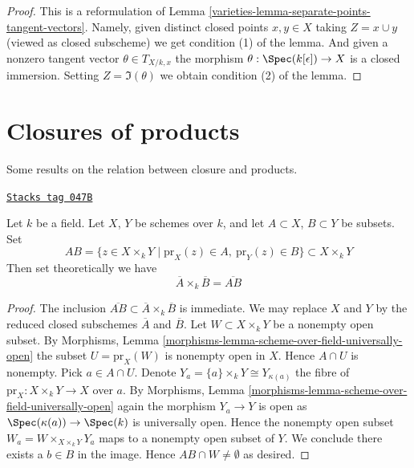 \begin{proof}

This is a reformulation of
Lemma \ref{varieties-lemma-separate-points-tangent-vectors}.
Namely, given distinct closed points
$x, y \in X$ taking $Z = x \cup y$ (viewed as closed
subscheme) we get condition (1) of the lemma.
And given a nonzero tangent vector $\theta \in T_{X/k, x}$
the morphism $\theta : \Spec(k[\epsilon]) \to X$
is a closed immersion. Setting $Z = \Im(\theta)$
we obtain condition (2) of the lemma.
\end{proof}

\section{Closures of products}
\label{varieties-section-closure-of-products}
Some results on the relation between closure and products.

\begin{lemma}
\label{varieties-lemma-closure-of-product}
\href{https://stacks.math.columbia.edu/tag/047B}{\texttt{Stacks tag 047B}}

Let $k$ be a field.
Let $X$, $Y$ be schemes over $k$, and let
$A \subset X$, $B \subset Y$ be subsets.
Set
$$
AB =
\{z \in X \times_k Y \mid \text{pr}_X(z) \in A, \ \text{pr}_Y(z) \in B\}
\subset X \times_k Y
$$
Then set theoretically we have
$$
\overline{A} \times_k \overline{B} = \overline{AB}
$$
\end{lemma}

\begin{proof}
The inclusion $\overline{AB} \subset \overline{A} \times_k \overline{B}$
is immediate.
We may replace $X$ and $Y$ by the reduced closed subschemes $\overline{A}$
and $\overline{B}$.
Let $W \subset X \times_k Y$ be a nonempty open subset. By
Morphisms, Lemma \ref{morphisms-lemma-scheme-over-field-universally-open}
the subset $U = \text{pr}_X(W)$ is nonempty open in $X$.
Hence $A \cap U$ is nonempty. Pick $a \in A \cap U$.
Denote $Y_a = \{a\} \times_k Y \cong Y_{\kappa(a)}$
the fibre of $\text{pr}_X : X \times_k Y \to X$ over $a$. By
Morphisms, Lemma \ref{morphisms-lemma-scheme-over-field-universally-open}
again the morphism $Y_a \to Y$ is open as
$\Spec(\kappa(a)) \to \Spec(k)$ is universally open.
Hence the nonempty open
subset $W_a = W \times_{X \times_k Y} Y_a$
maps to a nonempty open subset of $Y$.
We conclude there exists a $b \in B$ in the image.
Hence $AB \cap W \not = \emptyset$ as desired.
\end{proof}


